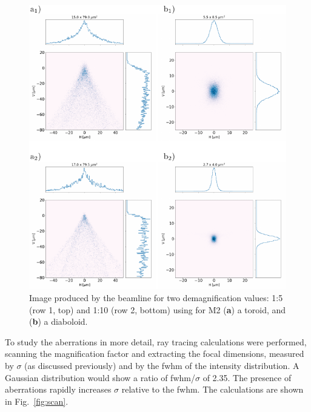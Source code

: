 \documentclass{iucr}       %
\begin{document}
\begin{figure}\label{fig:demagnification}
\includegraphics[width=1.0\textwidth]{figures/fig5.pdf}
% 
% 
\caption{Image produced by the beamline for two demagnification values: 1:5 (row 1, top) and 1:10 (row 2, bottom) using for M2 (\textbf{a}) a toroid, and (\textbf{b}) a diaboloid.}
\end{figure}

To study the aberrations in more detail, ray tracing calculations were performed, scanning the magnification factor and extracting the focal dimensions, measured by $\sigma$ (as discussed previously) and by the fwhm of the intensity distribution. A Gaussian distribution would show a ratio of fwhm/$\sigma$ of 2.35. The presence of aberrations rapidly increases $\sigma$ relative to the fwhm. The calculations are shown in Fig.~\ref{fig:scan}.
\end{document}
